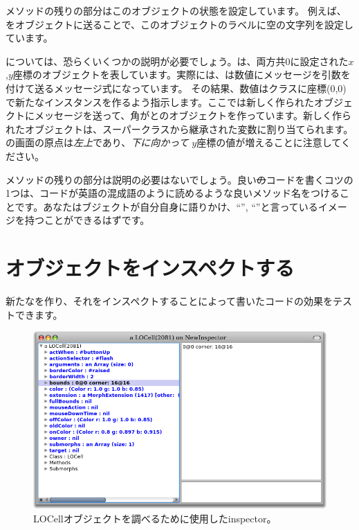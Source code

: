 \documentclass[a4paper,10pt,twoside]{book}
\begin{document}
メソッドの残りの部分はこのオブジェクトの状態を設定しています。
例えば、をオブジェクトに送ることで、このオブジェクトのラベルに空の文字列を設定しています。

については、恐らくいくつかの説明が必要でしょう。は、両方共0に設定された$x$,$y$座標のオブジェクトを表しています。実際には、は数値にメッセージを引数を付けて送るメッセージ式になっています。
その結果、数値はクラスに座標(0,0)で新たなインスタンスを作るよう指示します。ここでは新しく作られたオブジェクトにメッセージを送って、角がとのオブジェクトを作っています。新しく作られたオブジェクトは、スーパークラスから継承された変数に割り当てられます。
\pharo の画面の原点は\emph{左上}であり、\emph{下に向かって} $y$座標の値が増えることに注意してください。

メソッドの残りの部分は説明の必要はないでしょう。良い\st のコードを書くコツの1つは、コードが英語の混成語のように読めるような良いメソッド名をつけることです。あなたはブジェクトが自分自身に語りかけ、``'', ``''と言っているイメージを持つことができるはずです。

\section{オブジェクトをインスペクトする}

新たなを作り、それをインスペクトすることによって書いたコードの効果をテストできます。


\begin{figure}[htbp]
   \centering
   \includegraphics[width=\textwidth]{LOCellInspector} 
   \caption{LOCellオブジェクトを調べるために使用したinspector。}
\end{figure}
\end{document}
